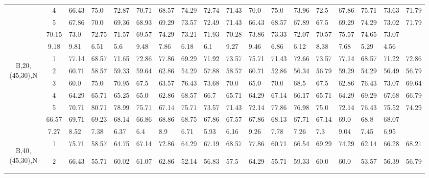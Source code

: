 \begin{table}[h]
{\begin{tabular}{cc|llll|llll|llll|llll}
 & 4 & 66.43 & 75.0 & 72.87 & 70.71 & 68.57 & 74.29 & 72.74 & 71.43 & 70.0 & 75.0 & 73.96 & 72.5 & 67.86 & 75.71 & 73.63 & 71.79 \\
 & 5 & 67.86 & 70.0 & 69.36 & 68.93 & 69.29 & 73.57 & 72.49 & 71.43 & 66.43 & 68.57 & 67.89 & 67.5 & 69.29 & 74.29 & 73.02 & 71.79 \\
\rowcolor{lightgray!50}\multicolumn{2}{r|}{avg} & 70.15 & 73.0 & 72.75 & 71.57 & 69.57 & 74.29 & 73.21 & 71.93 & 70.28 & 73.86 & 73.33 & 72.07 & 70.57 & 75.57 & 74.65 & 73.07 \\
\rowcolor{lightgray!50}\multicolumn{2}{r|}{std} & 9.18 & 9.81 & 6.51 & 5.6 & 9.48 & 7.86 & 6.18 & 6.1 & 9.27 & 9.46 & 6.86 & 6.12 & 8.38 & 7.68 & 5.29 & 4.56 \\
\multirow{5}{*}{\begin{sideways}B,20,(45,30),N\end{sideways}} & 1 & 77.14 & 68.57 & 71.65 & 72.86 & 77.86 & 69.29 & 71.92 & 73.57 & 75.71 & 71.43 & 72.66 & 73.57 & 77.14 & 68.57 & 71.22 & 72.86 \\
 & 2 & 60.71 & 58.57 & 59.33 & 59.64 & 62.86 & 54.29 & 57.88 & 58.57 & 60.71 & 52.86 & 56.34 & 56.79 & 59.29 & 54.29 & 56.49 & 56.79 \\
 & 3 & 60.0 & 75.0 & 70.95 & 67.5 & 63.57 & 76.43 & 73.68 & 70.0 & 65.0 & 70.0 & 68.5 & 67.5 & 62.86 & 76.43 & 73.07 & 69.64 \\
 & 4 & 64.29 & 65.71 & 65.25 & 65.0 & 62.86 & 68.57 & 66.7 & 65.71 & 64.29 & 67.14 & 66.17 & 65.71 & 64.29 & 69.29 & 67.68 & 66.79 \\
 & 5 & 70.71 & 80.71 & 78.99 & 75.71 & 67.14 & 75.71 & 73.57 & 71.43 & 72.14 & 77.86 & 76.98 & 75.0 & 72.14 & 76.43 & 75.52 & 74.29 \\
\rowcolor{lightgray!50}\multicolumn{2}{r|}{avg} & 66.57 & 69.71 & 69.23 & 68.14 & 66.86 & 68.86 & 68.75 & 67.86 & 67.57 & 67.86 & 68.13 & 67.71 & 67.14 & 69.0 & 68.8 & 68.07 \\
\rowcolor{lightgray!50}\multicolumn{2}{r|}{std} & 7.27 & 8.52 & 7.38 & 6.37 & 6.4 & 8.9 & 6.71 & 5.93 & 6.16 & 9.26 & 7.78 & 7.26 & 7.3 & 9.04 & 7.45 & 6.95 \\
\multirow{5}{*}{\begin{sideways}B,40,(45,30),N\end{sideways}} & 1 & 75.71 & 58.57 & 64.75 & 67.14 & 72.86 & 64.29 & 67.19 & 68.57 & 77.86 & 60.71 & 66.54 & 69.29 & 74.29 & 62.14 & 66.28 & 68.21 \\
 & 2 & 66.43 & 55.71 & 60.02 & 61.07 & 62.86 & 52.14 & 56.83 & 57.5 & 64.29 & 55.71 & 59.33 & 60.0 & 60.0 & 53.57 & 56.39 & 56.79 \\

\end{tabular}}
\end{table}

